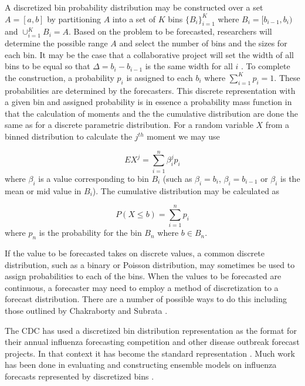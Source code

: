 \documentclass[11pt,notitlepage]{isuthesis}
\begin{document}
A discretized bin probability distribution may be constructed over a set 
$A = [a, b]$ by partitioning $A$ into a set of $K$ bins $\{B_i\}_{i=1}^{K}$
where $B_i = [b_{i-1}, b_i)$ and $\cup_{i=1}^{K} B_i = A$. Based on the problem
to be forecasted, researchers will determine the possible range $A$ and 
select the number of bins and the sizes for each bin. It may be the case
that a collaborative project will set the width of all bins to be equal so that 
$\Delta = b_i - b_{i-1}$ is the same width for all $i$ 
\cite[see for example]{mcgowan2019collaborative}.
To complete the construction, a probability $p_i$ is assigned to each $b_i$ 
where $\sum_{i=1}^{K}p_i = 1$. These probabilities are determined by the 
forecasters. 
This discrete representation with a given bin and assigned probability is in
essence a probability mass function in that the calculation of moments and the 
the cumulative distribution are done the same as for a discrete parametric 
distribution. For a random variable $X$ from a binned distribution to calculate
the $j^{th}$ moment we may use

\begin{equation}
\label{eq:bev}
  EX^j = \sum_{i=1}^n \beta_i^j p_i
\end{equation}
where $\beta_i$ is a value corresponding to bin $B_i$ (such as $\beta_i = b_i$,
$\beta_i = b_{i-1}$ or $\beta_i$ is the mean or mid value in $B_i$). The 
cumulative distribution may be calculated as

\begin{equation}
\label{eq:bcdf}
  P(X \leq b) = \sum_{i=1}^n p_i
\end{equation}
where $p_n$ is the probability for the bin $B_n$ where $b \in B_n$.

If the value to be forecasted takes on discrete values, a common discrete 
distribution, such as a binary or Poisson distribution, may sometimes be used to 
assign probabilities to each of the bins. When the values to be forecasted are
continuous, a forecaster may need to employ a method of discretization to a 
forecast distribution. There are a number of possible ways to do this including
those outlined by Chakraborty and Subrata \cite{chakraborty2015generating}.

The CDC has used a discretized bin distribution representation as the 
format
for their annual influenza forecasting competition and other disease outbreak
forecast projects.
In that context it has become the standard representation 
\cite{brooks2020comparing}. Much work has been done in evaluating 
and constructing ensemble models on influenza forecasts represented by 
discretized bins \cite{mcgowan2019collaborative, mcandrew2019adaptively,reich2019collaborative}. 
\end{document}
